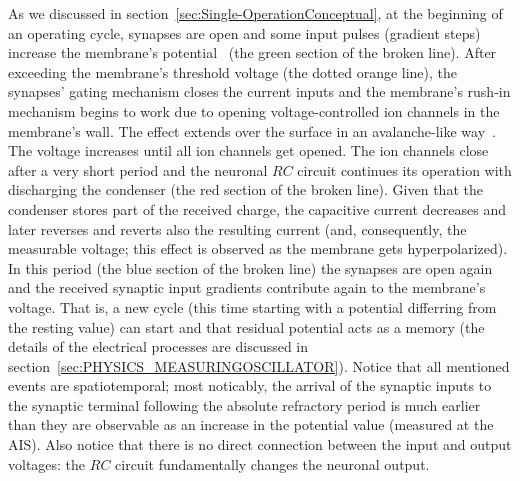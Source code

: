 As we discussed in section~\ref{sec:Single-OperationConceptual},
at the beginning of an operating cycle, synapses are open and some input pulses (gradient steps)
increase the membrane's potential~\cite{TransientResponses:2008,KochElectricalPropertiesSpike:1983} (the green section of the broken line).
After exceeding the membrane's threshold voltage (the dotted orange line), the synapses' gating mechanism closes the current inputs and
the membrane's rush-in mechanism begins to work due to opening voltage-controlled ion channels
in the membrane's wall. The effect extends over the surface in an
avalanche-like way~\cite{NeuronalAvalanches:2003}. The voltage increases
until all ion channels get opened. The ion channels close after a very short 
period and the neuronal $RC$ circuit continues its operation with discharging the condenser (the red section of the broken line). Given that the condenser stores part of the received charge,
the capacitive current decreases and later reverses and reverts also the resulting current (and, consequently, the measurable voltage; this effect is observed as the membrane gets hyperpolarized). 
In this period (the blue section of the broken line) the
synapses are open again and the received synaptic input gradients
contribute again to the membrane's voltage. That is, a new cycle 
(this time starting with a potential differring from the resting value)
can start and that residual potential acts as a memory
(the details of the electrical processes are discussed in section~\ref{sec:PHYSICS_MEASURINGOSCILLATOR}).
Notice that all mentioned events are spatiotemporal; most noticably,
the arrival of the synaptic inputs to the synaptic terminal
following the absolute refractory period is much earlier than
they are observable as an increase in the potential value (measured at
the 
\gls{AIS}).
Also notice that there is no direct connection between the
input and output voltages: the $RC$ circuit fundamentally
changes the neuronal output. 

